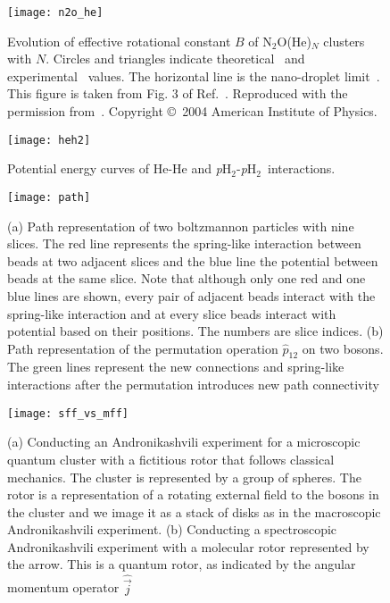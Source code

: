 \documentclass[12pt]{iopart}
\newcommand{\phtwo}{{\em p}H$_2$}
\begin{document}
\begin{figure}[h] 
\centerline {\texttt{[image: n2o\_he]}}
\caption{Evolution of effective rotational constant $B$ of N$_2$O(He)$_N$ clusters with $N$. Circles and triangles indicate theoretical~\cite{moroni_pn_pimc} and experimental~\cite{xu_turnaround_1} values. The horizontal line is the nano-droplet limit~\cite{nauta_n2o_he}. 
This figure is taken from Fig. 3 of Ref.~\cite{moroni_pn_pimc}. Reproduced with the permission from~\cite{moroni_pn_pimc}. Copyright \copyright~2004 American Institute of Physics.}
\label{fig:n2o_he}
\end{figure}

\begin{figure}[h]
\centerline {\texttt{[image: heh2]}}
\caption{Potential energy curves of He-He and \phtwo-\phtwo~interactions.}
\label{fig:heh2}
\end{figure}

\begin{figure}[h]
\centerline {\texttt{[image: path]}}
\caption{(a) Path representation of two boltzmannon particles with nine slices. The red line represents the spring-like interaction between beads at two adjacent slices and the blue line the potential between beads at the same slice. Note that although only one red and one blue lines are shown, every pair of adjacent beads interact with the spring-like interaction and at every slice beads interact with potential based on their positions. The numbers are slice indices. (b) Path representation of the permutation operation $\hat{p}_{12}$ on two bosons. The green lines represent the new connections and spring-like interactions after the permutation introduces new path connectivity}
\label{fig:path}
\end{figure}

\begin{figure}[h]
\centerline {\texttt{[image: sff\_vs\_mff]}}
\caption{(a) Conducting an Andronikashvili experiment for a microscopic quantum cluster with a fictitious rotor that follows classical mechanics. The cluster is represented by a group of spheres. The rotor is a representation of a rotating external field to the bosons in the cluster and we image it as a stack of disks as in the macroscopic Andronikashvili experiment. (b) Conducting a spectroscopic Andronikashvili experiment with a molecular rotor represented by the arrow. This is a quantum rotor, as indicated by the angular momentum operator $\hat{\vec{j}}$}
\label{fig:sff_mff}
\end{figure}
\end{document}
